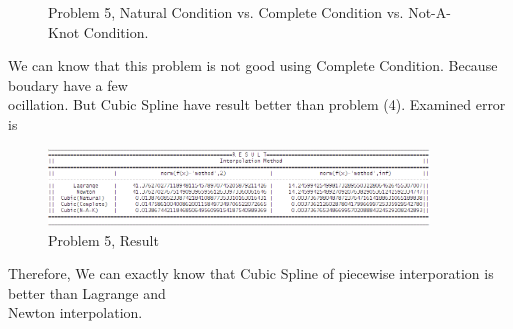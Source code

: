 \documentclass[10pt]{article}
\begin{document}
\begin{flushleft}
\begin{figure}[!h]
\begin{center}
		\caption{Problem 5, Natural Condition vs. Complete Condition vs. Not-A-Knot Condition. }
		\end{center}
	\end{figure}
	\quad\: We can know that this problem is not good using Complete Condition. Because boudary have a few\\ 		\quad\: ocillation. But Cubic Spline have result better than problem (4). Examined error is\\
	\begin{figure}[!h]
		\centering
		\begin{center}
		\includegraphics[width=0.9\textwidth]{5-r.png}
		\caption{Problem 5, Result}
		\end{center}
	\end{figure}
	\quad\: Therefore, We can exactly know that Cubic Spline of piecewise interporation is better than Lagrange and \\
	\quad\: Newton interpolation.  
  	\end{flushleft}
\end{document}
